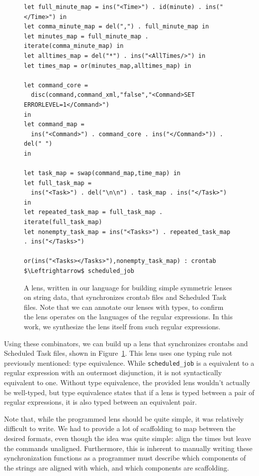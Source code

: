 \documentclass[acmsmall,screen,anonymous]{acmart}
\begin{document}
\begin{figure}
\begin{lstlisting}
let full_minute_map = ins("<Time>") . id(minute) . ins("</Time>") in
let comma_minute_map = del(",") . full_minute_map in
let minutes_map = full_minute_map . iterate(comma_minute_map) in
let alltimes_map = del("*") . ins("<AllTimes/>") in
let times_map = or(minutes_map,alltimes_map) in

let command_core = 
  disc(command,command_xml,"false","<Command>SET ERRORLEVEL=1</Command>")
in
let command_map = 
  ins("<Command>") . command_core . ins("</Command>")) . del(" ") 
in

let task_map = swap(command_map,time_map) in
let full_task_map = 
  ins("<Task>") . del("\n\n") . task_map . ins("</Task>") 
in
let repeated_task_map = full_task_map . iterate(full_task_map)
let nonempty_task_map = ins("<Tasks>") . repeated_task_map . ins("</Tasks>")

or(ins("<Tasks></Tasks>"),nonempty_task_map) : crontab $\Leftrightarrow$ scheduled_job
\end{lstlisting}
  \caption{A lens, written in our language for building simple symmetric lenses
    on string data, that synchronizes crontab files and Scheduled Task files.
    Note that we can annotate our lenses with types, to confirm the lens
    operates on the languages of the regular expressions. In this work, we
    synthesize the lens itself from such regular expressions. }
  \label{fig:example_lens}
\end{figure}

Using these combinators, we can build up a lens that synchronizes crontabs and
Scheduled Task files, shown in Figure~\ref{fig:example_lens}. This lens uses one
typing rule not previously mentioned: type equivalence. While
\lstinline{scheduled_job} is a equivalent to a regular expression with an
outermost disjunction, it is not syntactically equivalent to one. Without type
equivalence, the provided lens wouldn't actually be well-typed, but type
equivalence states that if a lens is typed between a pair of regular
expressions, it is also typed between an equivalent pair.

Note that, while the programmed lens should be quite simple, it was relatively
difficult to write. We had to provide a lot of scaffolding to map between the
desired formats, even though the idea was quite simple: align the times but
leave the commands unaligned. Furthermore, this is inherent to manually writing
these synchronization functions as a programmer must describe which components
of the strings are aligned with which, and which components are scaffolding.
\end{document}
